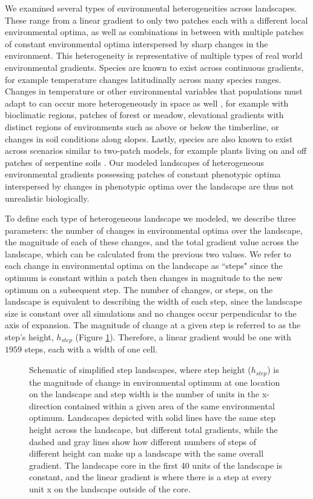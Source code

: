 We examined several types of environmental heterogeneities across landscapes. These range from a linear gradient to only two patches each with a different local environmental optima, as well as combinations in between with multiple patches of constant environmental optima interspersed by sharp changes in the environment. This heterogeneity is representative of multiple types of real world environmental gradients. Species are known to exist across continuous gradients, for example temperature changes latitudinally across many species ranges. Changes in temperature or other environmental variables that populations must adapt to can occur more heterogeneously in space as well \citep{Pickett:1997}, for example with bioclimatic regions, patches of forest or meadow, elevational gradients with distinct regions of environments such as above or below the timberline, or changes in soil conditions along slopes. Lastly, species are also known to exist across scenarios similar to two-patch models, for example plants living on and off patches of serpentine soils \citep{Brady:2005}. Our modeled landscapes of heterogeneous environmental gradients possessing patches of constant phenotypic optima interspersed by changes in phenotypic optima over the landscape are thus not unrealistic biologically. 

To define each type of heterogeneous landscape we modeled, we describe three parameters: the number of changes in environmental optima over the landscape, the magnitude of each of these changes, and the total gradient value across the landscape, which can be calculated from the previous two values. We refer to each change in environmental optima on the landscape as ``steps" since the optimum is constant within a patch then changes in magnitude to the new optimum on a subsequent step. The number of changes, or steps, on the landscape is equivalent to describing the width of each step, since the landscape size is constant over all simulations and no changes occur perpendicular to the axis of expansion. The magnitude of change at a given step is referred to as the step's height, $h_{step}$ (Figure \ref{fig:stepschematic}). Therefore, a linear gradient would be one with $1959$ steps, each with a width of one cell. 

\begin{figure}[h]
\centering
{}
\caption[Schematic of step landscapes.]{Schematic of simplified step landscapes, where step height ($h_{step}$) is the magnitude of change in environmental optimum at one location on the landscape and step width is the number of units in the x-direction contained within a given area of the same environmental optimum. Landscapes depicted with solid lines have the same step height across the landscape, but different total gradients, while the dashed and gray lines show how different numbers of steps of different height can make up a landscape with the same overall gradient. The landscape core in the first 40 units of the landscape is constant, and the linear gradient is where there is a step at every unit x on the landscape outside of the core.}
\label{fig:stepschematic}
\end{figure}


